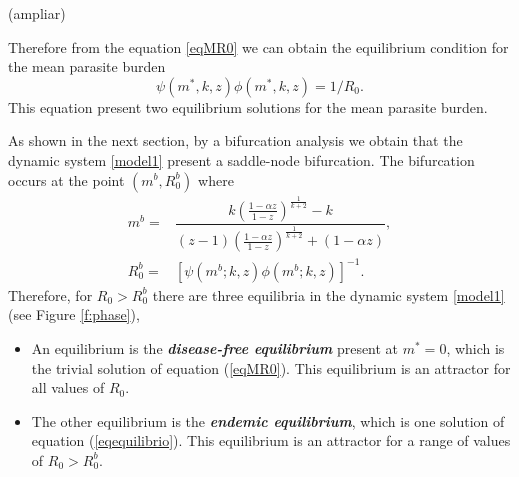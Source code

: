 \documentclass[eng]{MMSB-class-eng}
\begin{document}
{{\color{blue}(ampliar)}





Therefore from the equation \eqref{eqMR0} we can obtain the equilibrium condition for the mean parasite burden
\begin{equation}\label{eqequilibrio}
\psi(m^*,k,z)\phi(m^*,k,z)=1/R_0.
\end{equation}
This equation present two  equilibrium solutions for the mean parasite burden. 

As shown in the next section, by a bifurcation analysis we obtain that the dynamic system \eqref{model1} 
present a saddle-node bifurcation.
The bifurcation occurs at the point $(m^b, R_0^b)$ where
\begin{equation}\label{meq}
\begin{split}
m^b=&\dfrac{k\left( \frac{1-\alpha z}{1-z}\right)^{\frac{1}{k+2}} - k}{(z-1)\left( \frac{1-\alpha z}{1-z}\right)^{\frac{1}{k+2}} + (1-\alpha z)},\\ R_0^b=&\left[ \psi(m^b;k,z)\phi(m^b;k,z)\right]^{-1}.
\end{split}	
\end{equation}
Therefore, for $R_0 > R_0^b$ there are three equilibria in the dynamic system \eqref{model1} (see Figure \ref{f:phase}),
\begin{itemize}
	\item An equilibrium is the \textit{\textbf{disease-free equilibrium}} present at $m^*= 0$, which is the trivial solution of equation (\ref{eqMR0}). 
	This equilibrium is an attractor for all values of $R_0$.
	
	\item The other equilibrium
	is the \textit{\textbf{endemic equilibrium}}, which is one solution of equation (\ref{eqequilibrio}).
	This equilibrium is an attractor for a range of values of $R_0> R_0^b $.
	

\end{itemize}}
\end{document}
